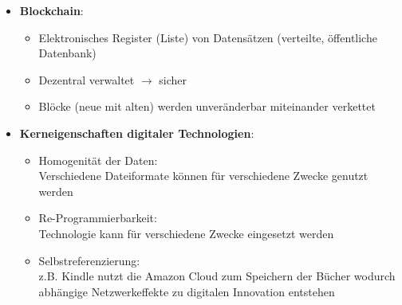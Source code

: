 \documentclass[12pt,a4paper]{article}
\begin{document}
\begin{itemize}
   \item \textbf{Blockchain}:
      \begin{itemize}
			\item Elektronisches Register (Liste) von Datensätzen (verteilte, öffentliche Datenbank)
			\item Dezentral verwaltet $\rightarrow$ sicher
			\item Blöcke (neue mit alten) werden unveränderbar miteinander verkettet
      \end{itemize}

   \item \textbf{Kerneigenschaften digitaler Technologien}:
      \begin{itemize}
			\item Homogenität der Daten:\\
			      Verschiedene Dateiformate können für verschiedene Zwecke genutzt werden
			\item Re-Programmierbarkeit:\\
			      Technologie kann für verschiedene Zwecke eingesetzt werden
			\item Selbstreferenzierung:\\
			      z.B. Kindle nutzt die Amazon Cloud zum Speichern der Bücher wodurch abhängige Netzwerkeffekte zu digitalen Innovation entstehen
      \end{itemize}
\end{itemize}


\vspace*{0.5cm}
\end{document}
